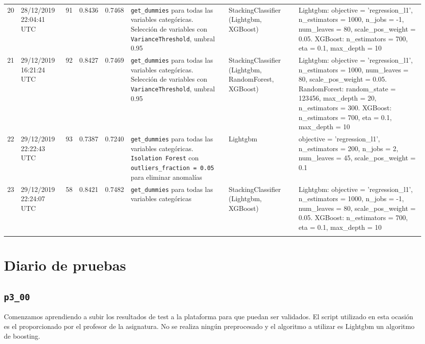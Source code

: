 \documentclass[a4paper, 20pt]{article}
\begin{document}
\begin{longtable}{lL{2cm}lllL{3cm}L{2.5cm}L{3.5cm}}
20 & 28/12/2019 22:04:41 UTC & 91 & 0.8436 & 0.7468 & \texttt{get\_dummies} para todas las variables categóricas. Selección de variables con \texttt{VarianceThreshold}, umbral 0.95 & StackingClassifier (Lightgbm, XGBoost) & Lightgbm: {\ttfamily objective = 'regression\_l1', n\_estimators = 1000, n\_jobs = -1, num\_leaves = 80, scale\_pos\_weight = 0.05}. XGBoost: {\ttfamily n\_estimators = 700, eta = 0.1, max\_depth = 10}\\
\midrule

21 & 29/12/2019 16:21:24 UTC & 92 & 0.8427 & 0.7469 & \texttt{get\_dummies} para todas las variables categóricas. Selección de variables con \texttt{VarianceThreshold}, umbral 0.95 & StackingClassifier (Lightgbm, RandomForest, XGBoost) & Lightgbm: {\ttfamily objective = 'regression\_l1', n\_estimators = 1000, num\_leaves = 80, scale\_pos\_weight = 0.05}. RandomForest: {\ttfamily random\_state = 123456, max\_depth = 20, n\_estimators = 300}. XGBoost: {\ttfamily n\_estimators = 700, eta = 0.1, max\_depth = 10}\\

22 & 29/12/2019 22:22:43 UTC & 93 & 0.7387 & 0.7240 & \texttt{get\_dummies} para todas las variables categóricas. \texttt{Isolation Forest} con \texttt{outliers\_fraction = 0.05} para eliminar anomalías & Lightgbm & {\ttfamily objective = 'regression\_l1', n\_estimators = 200, n\_jobs = 2, num\_leaves = 45, scale\_pos\_weight = 0.1}\\
\midrule

23 & 29/12/2019 22:24:07 UTC & 58 & 0.8421 & 0.7482 & \texttt{get\_dummies} para todas las variables categóricas & StackingClassifier (Lightgbm, XGBoost) & Lightgbm: {\ttfamily objective = 'regression\_l1', n\_estimators = 1000, n\_jobs = -1, num\_leaves = 80, scale\_pos\_weight = 0.05}. XGBoost: {\ttfamily n\_estimators = 700, eta = 0.1, max\_depth = 10}\\
\midrule
{}
\bottomrule
\end{longtable}
\newpage

\section{Diario de pruebas}
\subsection{\texttt{p3\_00}}
Comenzamos aprendiendo a subir los resultados de test a la plataforma para que puedan ser validados. El script utilizado en esta ocasión es el proporcionado por el profesor de la asignatura. No se realiza ningún preprocesado y el algoritmo a utilizar es Lightgbm un algoritmo de boosting.
\end{document}
